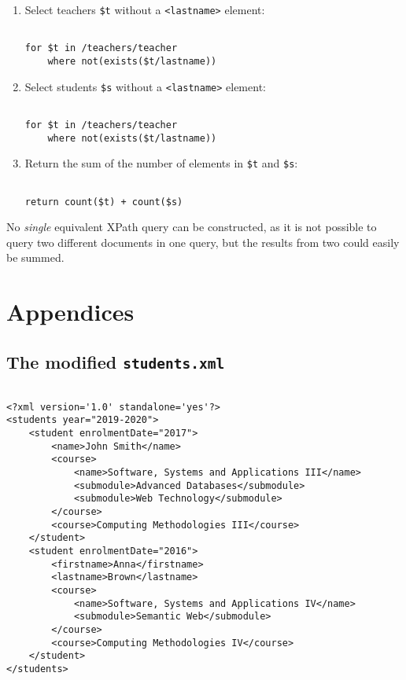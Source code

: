 \documentclass[11pt]{article} %
\begin{document}
\begin{enumerate}

\item{Select teachers \verb|$t| without a \verb|<lastname>| element:}

\begin{verbatim}

for $t in /teachers/teacher
	where not(exists($t/lastname))

\end{verbatim}

\item{Select students \verb|$s| without a \verb|<lastname>| element:}

\begin{verbatim}

for $t in /teachers/teacher
	where not(exists($t/lastname))

\end{verbatim}

\item{Return the sum of the number of elements in \verb|$t| and \verb|$s|}:

\begin{verbatim}

return count($t) + count($s)

\end{verbatim}

\end{enumerate}

No \textit{single} equivalent XPath query can be constructed, as it is not possible to query two different documents in one query, but the results from two could easily be summed.

\clearpage
\section*{Appendices}
\subsection*{The modified \texttt{students.xml}}

\begin{verbatim}

<?xml version='1.0' standalone='yes'?>
<students year="2019-2020">
    <student enrolmentDate="2017">
        <name>John Smith</name>
        <course>
            <name>Software, Systems and Applications III</name>
            <submodule>Advanced Databases</submodule>
            <submodule>Web Technology</submodule>
        </course>
        <course>Computing Methodologies III</course>
    </student>
    <student enrolmentDate="2016">
        <firstname>Anna</firstname>
        <lastname>Brown</lastname>
        <course>
            <name>Software, Systems and Applications IV</name>
            <submodule>Semantic Web</submodule>
        </course>
        <course>Computing Methodologies IV</course>
    </student>
</students>

\end{verbatim}
\end{document}

